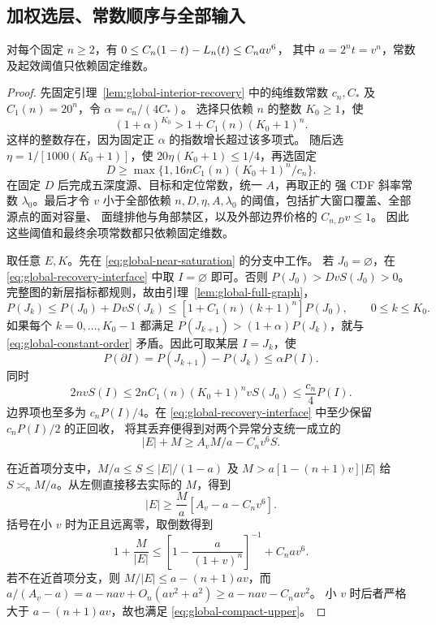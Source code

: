 \subsection{加权选层、常数顺序与全部输入}

\begin{proposition}[六阶粗余项]\label{prop:global-coarse}
对每个固定 \(n\ge2\)，有 \(0\le C_n(1-t)-L_n(t)\le C_nav^6\)，
其中 \(a=2^nt=v^n\)，常数及起效阈值只依赖固定维数。
\end{proposition}
\begin{proof}
先固定引理~\ref{lem:global-interior-recovery} 中的纯维数常数
\(c_n,C_*\) 及 \(C_1(n)=20^n\)，令 \(\alpha=c_n/(4C_*)\)。
选择只依赖 \(n\) 的整数 \(K_0\ge1\)，使
\begin{equation}\label{eq:global-constant-order}
 (1+\alpha)^{K_0}>1+C_1(n)(K_0+1)^n.
\end{equation}
这样的整数存在，因为固定正 \(\alpha\) 的指数增长超过该多项式。
随后选 \(\eta=1/[1000(K_0+1)]\)，使
\(20\eta(K_0+1)\le1/4\)，再选固定
\[
 D\ge\max\{1,16nC_1(n)(K_0+1)^n/c_n\}.
\]
在固定 \(D\) 后完成五深度源、目标和定位常数，统一 \(A\)，再取正的
强 CDF 斜率常数 \(\lambda_0\)。最后才令 \(v\) 小于全部依赖
\(n,D,\eta,A,\lambda_0\) 的阈值，包括扩大窗口覆盖、全部源点的面对容量、
面缝排他与角部禁区，以及外部边界价格的
\(C_{n,D}v\le1\)。
因此这些阈值和最终余项常数都只依赖固定维数。

取任意 \(E,K\)。先在 \eqref{eq:global-near-saturation} 的分支中工作。
若 \(J_0=\varnothing\)，在 \eqref{eq:global-recovery-interface} 中取
\(I=\varnothing\) 即可。否则 \(P(J_0)>DvS(J_0)>0\)。
完整图的新层指标都规则，故由引理~\ref{lem:global-full-graph}，
\[
 P(J_k)\le P(J_0)+DvS(J_k)
 \le[1+C_1(n)(k+1)^n]P(J_0),\qquad 0\le k\le K_0.
\]
如果每个 \(k=0,\ldots,K_0-1\) 都满足
\(P(J_{k+1})>(1+\alpha)P(J_k)\)，就与
\eqref{eq:global-constant-order} 矛盾。因此可取某层 \(I=J_k\)，使
\begin{equation}\label{eq:global-weighted-boundary}
 P(\partial I)=P(J_{k+1})-P(J_k)\le\alpha P(I).
\end{equation}
同时
\[
 2nvS(I)\le2nC_1(n)(K_0+1)^n vS(J_0)
 \le\frac{c_n}{4}P(I).
\]
边界项也至多为 \(c_nP(I)/4\)。在
\eqref{eq:global-recovery-interface} 中至少保留 \(c_nP(I)/2\) 的正回收，
将其丢弃便得到对两个异常分支统一成立的
\begin{equation}\label{eq:global-final-volume}
 |E|+M\ge A_vM/a-C_nv^6S.
\end{equation}

在近首项分支中，\(M/a\le S\le|E|/(1-a)\) 及
\(M>a[1-(n+1)v]|E|\) 给 \(S\asymp_n M/a\)。从左侧直接移去实际的 \(M\)，得到
\[
 |E|\ge\frac Ma[A_v-a-C_nv^6].
\]
括号在小 \(v\) 时为正且远离零，取倒数得到
\begin{equation}\label{eq:global-compact-upper}
 1+\frac M{|E|}\le
 \left[1-\frac{a}{(1+v)^n}\right]^{-1}+C_nav^6.
\end{equation}
若不在近首项分支，则
\(M/|E|\le a-(n+1)av\)，而
\(a/(A_v-a)=a-nav+O_n(av^2+a^2)\ge a-nav-C_nav^2\)。
小 \(v\) 时后者严格大于 \(a-(n+1)av\)，故也满足
\eqref{eq:global-compact-upper}。


\end{proof}
